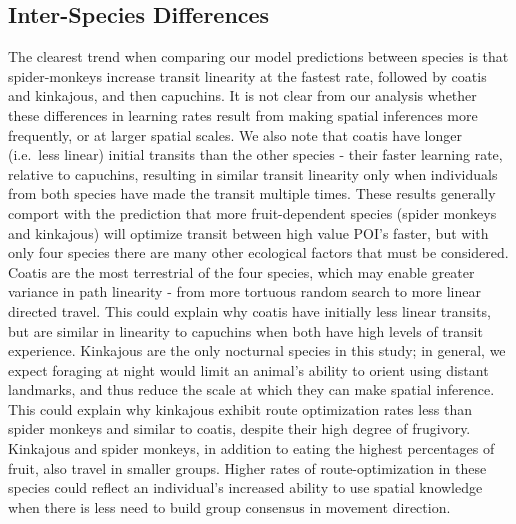\documentclass[twoside,12pt,final]{ucthesis-CA2012}
\begin{document}
\begin{ucmainmatter}
\hypertarget{inter-species-differences}{%
\subsection{Inter-Species Differences}\label{inter-species-differences}}

The clearest trend when comparing our model predictions between species is that spider-monkeys increase transit linearity at the fastest rate, followed by coatis and kinkajous, and then capuchins. It is not clear from our analysis whether these differences in learning rates result from making spatial inferences more frequently, or at larger spatial scales. We also note that coatis have longer (i.e.~less linear) initial transits than the other species - their faster learning rate, relative to capuchins, resulting in similar transit linearity only when individuals from both species have made the transit multiple times. These results generally comport with the prediction that more fruit-dependent species (spider monkeys and kinkajous) will optimize transit between high value POI's faster, but with only four species there are many other ecological factors that must be considered. Coatis are the most terrestrial of the four species, which may enable greater variance in path linearity - from more tortuous random search to more linear directed travel. This could explain why coatis have initially less linear transits, but are similar in linearity to capuchins when both have high levels of transit experience. Kinkajous are the only nocturnal species in this study; in general, we expect foraging at night would limit an animal's ability to orient using distant landmarks, and thus reduce the scale at which they can make spatial inference. This could explain why kinkajous exhibit route optimization rates less than spider monkeys and similar to coatis, despite their high degree of frugivory. Kinkajous and spider monkeys, in addition to eating the highest percentages of fruit, also travel in smaller groups. Higher rates of route-optimization in these species could reflect an individual's increased ability to use spatial knowledge when there is less need to build group consensus in movement direction.


\end{ucmainmatter}
\end{document}

